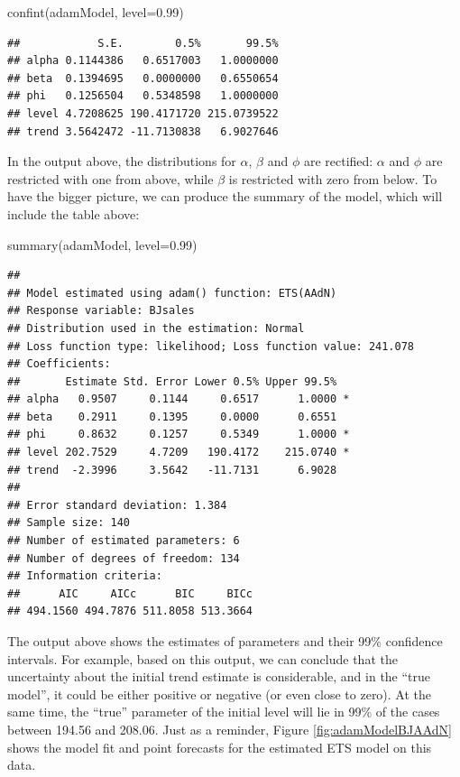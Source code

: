 \documentclass[
]{book}
\newenvironment{Shaded}{\begin{snugshade}}{\end{snugshade}}
\newcommand{\AttributeTok}[1]{\textcolor[rgb]{0.77,0.63,0.00}{#1}}
\newcommand{\FloatTok}[1]{\textcolor[rgb]{0.00,0.00,0.81}{#1}}
\newcommand{\FunctionTok}[1]{\textcolor[rgb]{0.00,0.00,0.00}{#1}}
\newcommand{\NormalTok}[1]{#1}
\theoremstyle{definition}
\theoremstyle{definition}
\theoremstyle{definition}
\theoremstyle{definition}
\theoremstyle{remark}
\begin{document}
\begin{Shaded}
\begin{Highlighting}[]
\FunctionTok{confint}\NormalTok{(adamModel, }\AttributeTok{level=}\FloatTok{0.99}\NormalTok{)}
\end{Highlighting}
\end{Shaded}

\begin{verbatim}
##            S.E.        0.5%       99.5%
## alpha 0.1144386   0.6517003   1.0000000
## beta  0.1394695   0.0000000   0.6550654
## phi   0.1256504   0.5348598   1.0000000
## level 4.7208625 190.4171720 215.0739522
## trend 3.5642472 -11.7130838   6.9027646
\end{verbatim}

In the output above, the distributions for \(\alpha\), \(\beta\) and \(\phi\) are rectified: \(\alpha\) and \(\phi\) are restricted with one from above, while \(\beta\) is restricted with zero from below. To have the bigger picture, we can produce the summary of the model, which will include the table above:

\begin{Shaded}
\begin{Highlighting}[]
\FunctionTok{summary}\NormalTok{(adamModel, }\AttributeTok{level=}\FloatTok{0.99}\NormalTok{)}
\end{Highlighting}
\end{Shaded}

\begin{verbatim}
## 
## Model estimated using adam() function: ETS(AAdN)
## Response variable: BJsales
## Distribution used in the estimation: Normal
## Loss function type: likelihood; Loss function value: 241.078
## Coefficients:
##       Estimate Std. Error Lower 0.5% Upper 99.5%  
## alpha   0.9507     0.1144     0.6517      1.0000 *
## beta    0.2911     0.1395     0.0000      0.6551  
## phi     0.8632     0.1257     0.5349      1.0000 *
## level 202.7529     4.7209   190.4172    215.0740 *
## trend  -2.3996     3.5642   -11.7131      6.9028  
## 
## Error standard deviation: 1.384
## Sample size: 140
## Number of estimated parameters: 6
## Number of degrees of freedom: 134
## Information criteria:
##      AIC     AICc      BIC     BICc 
## 494.1560 494.7876 511.8058 513.3664
\end{verbatim}

The output above shows the estimates of parameters and their 99\% confidence intervals. For example, based on this output, we can conclude that the uncertainty about the initial trend estimate is considerable, and in the ``true model'', it could be either positive or negative (or even close to zero). At the same time, the ``true'' parameter of the initial level will lie in 99\% of the cases between 194.56 and 208.06. Just as a reminder, Figure \ref{fig:adamModelBJAAdN} shows the model fit and point forecasts for the estimated ETS model on this data.
\end{document}

